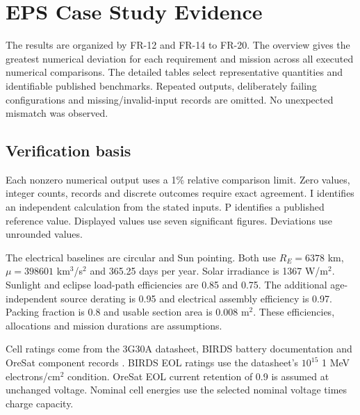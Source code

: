 \chapter{EPS Case Study Evidence}\label{appendix:eps-case-studies}

The results are organized by FR-12 and FR-14 to FR-20.
The overview gives the greatest numerical deviation for each requirement and mission across all executed numerical comparisons.
The detailed tables select representative quantities and identifiable published benchmarks.
Repeated outputs, deliberately failing configurations and missing/invalid-input records are omitted.
No unexpected mismatch was observed.

\section{Verification basis}
\label{appendix:eps-case-basis}
Each nonzero numerical output uses a 1\% relative comparison limit.
Zero values, integer counts, records and discrete outcomes require exact agreement.
I identifies an independent calculation from the stated inputs.
P identifies a published reference value.
Displayed values use seven significant figures. Deviations use unrounded values.

The electrical baselines are circular and Sun pointing.
Both use $R_E=6378$ km, $\mu=398601$ km$^3$/s$^2$ and 365.25 days per year.
Solar irradiance is 1367 W/m$^2$.
Sunlight and eclipse load-path efficiencies are 0.85 and 0.75.
The additional age-independent source derating is 0.95 and electrical assembly efficiency is 0.97.
Packing fraction is 0.8 and usable section area is 0.008 m$^2$.
These efficiencies, allocations and mission durations are assumptions.

Cell ratings come from the 3G30A datasheet, BIRDS battery documentation and OreSat component records \citep{cots-mission_azur_space_3g30a_review_legacy_ds,birds2021batteryverification,greenberg2021oresat,oresat2025solardesign,cots-mission_tenergy_30005_0_ds}.
BIRDS EOL ratings use the datasheet's $10^{15}$ 1 MeV electrons/cm$^2$ condition.
OreSat EOL current retention of 0.9 is assumed at unchanged voltage.
Nominal cell energies use the selected nominal voltage times charge capacity.


